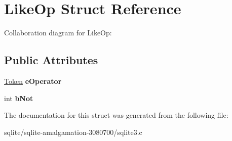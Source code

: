 \hypertarget{struct_like_op}{\section{Like\+Op Struct Reference}
\label{struct_like_op}
}


Collaboration diagram for Like\+Op\+:
\subsection*{Public Attributes}
\begin{DoxyCompactItemize}
\item 
\hypertarget{struct_like_op_a02dccb0eea9610285333434a755acae8}{\hyperlink{struct_token}{Token} {\bfseries e\+Operator}}\label{struct_like_op_a02dccb0eea9610285333434a755acae8}

\item 
\hypertarget{struct_like_op_a09daccf65c917f32e8b60b347e8893cf}{int {\bfseries b\+Not}}\label{struct_like_op_a09daccf65c917f32e8b60b347e8893cf}

\end{DoxyCompactItemize}


The documentation for this struct was generated from the following file\+:\begin{DoxyCompactItemize}
\item 
sqlite/sqlite-\/amalgamation-\/3080700/sqlite3.\+c\end{DoxyCompactItemize}
